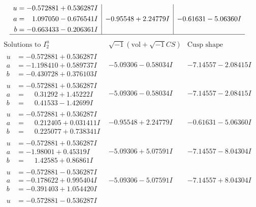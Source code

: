 \documentclass[1p]{elsarticle_modified}
\theoremstyle{definition}
\newcommand{\I}{\sqrt{-1}}
\begin{document}
$$\begin{array}{c|c|c}
\begin{aligned}
u &= -0.572881 + 0.536287 I \\
a &= \phantom{-}1.097050 - 0.676541 I \\
b &= -0.663433 - 0.206361 I\end{aligned}
 & -0.95548 + 2.24779 I & -0.61631 - 5.06360 I\\
 \hline 
 \end{array}$$\newpage$$\begin{array}{c|c|c}  
\text{Solutions to }I^u_{2}& \I (\text{vol} + \sqrt{-1}CS) & \text{Cusp shape}\\
 \hline 
\begin{aligned}
u &= -0.572881 + 0.536287 I \\
a &= -1.198410 + 0.589737 I \\
b &= -0.430728 + 0.376103 I\end{aligned}
 & -5.09306 - 0.58034 I & -7.14557 - 2.08415 I \\ \hline\begin{aligned}
u &= -0.572881 + 0.536287 I \\
a &= \phantom{-}0.31292 + 1.45222 I \\
b &= \phantom{-}0.41533 - 1.42699 I\end{aligned}
 & -5.09306 - 0.58034 I & -7.14557 - 2.08415 I \\ \hline\begin{aligned}
u &= -0.572881 + 0.536287 I \\
a &= \phantom{-}0.212405 + 0.031411 I \\
b &= \phantom{-}0.225077 + 0.738341 I\end{aligned}
 & -0.95548 + 2.24779 I & -0.61631 - 5.06360 I \\ \hline\begin{aligned}
u &= -0.572881 + 0.536287 I \\
a &= -1.98001 + 0.45319 I \\
b &= \phantom{-}1.42585 + 0.86861 I\end{aligned}
 & -5.09306 + 5.07591 I & -7.14557 - 8.04304 I \\ \hline\begin{aligned}
u &= -0.572881 - 0.536287 I \\
a &= -0.178622 + 0.995404 I \\
b &= -0.391403 + 1.054420 I\end{aligned}
 & -5.09306 - 5.07591 I & -7.14557 + 8.04304 I \\ \hline\begin{aligned}
u &= -0.572881 - 0.536287 I \\

\end{aligned}
\end{array}$$
\end{document}
